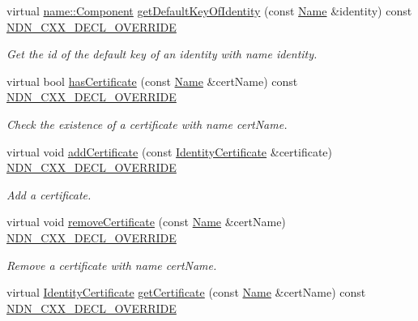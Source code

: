 \begin{DoxyCompactItemize}
virtual \hyperlink{classndn_1_1name_1_1Component}{name\+::\+Component} \hyperlink{classndn_1_1security_1_1PibMemory_af3c3a94aea2e4780151cd3718b4db45b}{get\+Default\+Key\+Of\+Identity} (const \hyperlink{classndn_1_1Name}{Name} \&identity) const \hyperlink{ndn-cxx_2src_2common_8hpp_a901daa44edd42d3f44df61d77277d57f}{N\+D\+N\+\_\+\+C\+X\+X\+\_\+\+D\+E\+C\+L\+\_\+\+O\+V\+E\+R\+R\+I\+DE}
\begin{DoxyCompactList}\small\item\em Get the id of the default key of an identity with name {\ttfamily identity}. \end{DoxyCompactList}\item 
virtual bool \hyperlink{classndn_1_1security_1_1PibMemory_a2d6282fc69cdb324a44469b4b45531b2}{has\+Certificate} (const \hyperlink{classndn_1_1Name}{Name} \&cert\+Name) const \hyperlink{ndn-cxx_2src_2common_8hpp_a901daa44edd42d3f44df61d77277d57f}{N\+D\+N\+\_\+\+C\+X\+X\+\_\+\+D\+E\+C\+L\+\_\+\+O\+V\+E\+R\+R\+I\+DE}
\begin{DoxyCompactList}\small\item\em Check the existence of a certificate with name {\ttfamily cert\+Name}. \end{DoxyCompactList}\item 
virtual void \hyperlink{classndn_1_1security_1_1PibMemory_a5c47be3ec03ad0c7c56658abb9402dc0}{add\+Certificate} (const \hyperlink{classndn_1_1IdentityCertificate}{Identity\+Certificate} \&certificate) \hyperlink{ndn-cxx_2src_2common_8hpp_a901daa44edd42d3f44df61d77277d57f}{N\+D\+N\+\_\+\+C\+X\+X\+\_\+\+D\+E\+C\+L\+\_\+\+O\+V\+E\+R\+R\+I\+DE}
\begin{DoxyCompactList}\small\item\em Add a certificate. \end{DoxyCompactList}\item 
virtual void \hyperlink{classndn_1_1security_1_1PibMemory_ac757255c5a47b57d3aac547654a1d97d}{remove\+Certificate} (const \hyperlink{classndn_1_1Name}{Name} \&cert\+Name) \hyperlink{ndn-cxx_2src_2common_8hpp_a901daa44edd42d3f44df61d77277d57f}{N\+D\+N\+\_\+\+C\+X\+X\+\_\+\+D\+E\+C\+L\+\_\+\+O\+V\+E\+R\+R\+I\+DE}
\begin{DoxyCompactList}\small\item\em Remove a certificate with name {\ttfamily cert\+Name}. \end{DoxyCompactList}\item 
virtual \hyperlink{classndn_1_1IdentityCertificate}{Identity\+Certificate} \hyperlink{classndn_1_1security_1_1PibMemory_a9195c3aa71d64d1280470c92b06215b7}{get\+Certificate} (const \hyperlink{classndn_1_1Name}{Name} \&cert\+Name) const \hyperlink{ndn-cxx_2src_2common_8hpp_a901daa44edd42d3f44df61d77277d57f}{N\+D\+N\+\_\+\+C\+X\+X\+\_\+\+D\+E\+C\+L\+\_\+\+O\+V\+E\+R\+R\+I\+DE}

\end{DoxyCompactItemize}
